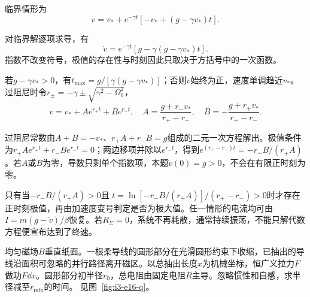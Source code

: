 \begin{solution}
临界情形为
\[
v=v_*+e^{-\gamma t}[-v_*+(g-\gamma v_*)t].
\]

对临界解逐项求导，有
\[
\dot v=e^{-\gamma t}[g-\gamma(g-\gamma v_*)t].
\]
指数不改变符号，极值的存在性与时刻因此只取决于方括号中的一次函数。


若$g-\gamma v_*>0$，有$t_{\max}=g/[\gamma(g-\gamma v_*)]$；否则$\dot v$始终为正，速度单调趋近$v_*$。过阻尼时令$r_\pm=-\gamma\pm\sqrt{\gamma^2-\Omega_0^2}$，
\[
v=v_*+Ae^{r_+t}+Be^{r_-t},\quad
A=\frac{g+r_-v_*}{r_+-r_-},\quad
B=-\frac{g+r_+v_*}{r_+-r_-}.
\]

过阻尼常数由$A+B=-v_*$、$r_+A+r_-B=g$组成的二元一次方程解出。极值条件为$r_+Ae^{r_+t}+r_-Be^{r_-t}=0$；两边移项并除以$e^{r_-t}$，得到$e^{(r_+-r_-)t}=-r_-B/(r_+A)$。若$A$或$B$为零，导数只剩单个指数项，本题$\dot v(0)=g>0$，不会在有限正时刻为零。


只有当$-r_-B/(r_+A)>0$且
$t=\ln[-r_-B/(r_+A)]/(r_+-r_-)>0$时才存在正时刻极值，再由加速度变号判定是否为极大值。任一情形的电流均可由$I=m(g-\dot v)/\beta$恢复。若$R_\Sigma=0$，系统不再耗散，通常持续振荡，不能只解代数方程便宣布达到了终速。
\end{solution}

\begin{example}[恒力抽拉圆形柔线圈]\label{ex:i3-e16}

均匀磁场$B$垂直纸面。一根柔导线的圆形部分在光滑圆形约束下收缩，已抽出的导线沿面积可忽略的并行路径离开磁区。以总抽出长度$x$为机械坐标，恒广义拉力$F$做功$F\dd x$。圆形部分初半径$r_0$，总电阻由固定电阻$R$主导。忽略惯性和自感，求半径减至$r_{\min}$的时间。
 见图~\ref{fig:i3-e16-q}。
\end{example}

